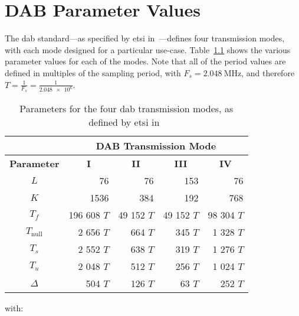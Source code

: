 \documentclass[class=report,11pt,crop=false]{standalone}
\begin{document}
\chapter{DAB Parameter Values \label{sect:dab-values_t-mode}}

The \gls{dab} standard---as specified by \gls{etsi} in~\cite{dabstandard}---defines four transmission modes, with each mode designed for a particular use-case. Table~\ref{tab:dab-parameters} shows the various parameter values for each of the modes. Note that all of the period values are defined in multiples of the sampling period, with \(F_s = \SI{2.048}{\mega\hertz}\), and therefore $T = \frac{1}{F_s} = \frac{1}{\num{2.048e6}}$.

{
\renewcommand{\arraystretch}{1.25}
\begin{table}[h]
    \centering
    \captionsetup{type=table}
    \begin{tabular}{c|r|r|r|r|}
    \cline{2-5}
     & \multicolumn{4}{c|}{\textbf{DAB Transmission Mode}} \\ \hline
    \multicolumn{1}{|c|}{\textbf{Parameter}} & \multicolumn{1}{c|}{\textbf{I}} & \multicolumn{1}{c|}{\textbf{II}} & \multicolumn{1}{c|}{\textbf{III}} & \multicolumn{1}{c|}{\textbf{IV}} \\ \hline
    \multicolumn{1}{|c|}{$L$} & 76 & 76 & 153 & 76 \\ \hline
    \multicolumn{1}{|c|}{$K$} & 1536 & 384 & 192 & 768 \\ \hline
    \multicolumn{1}{|c|}{$T_f$} & 196 608 $T$ & 49 152 $T$ & 49 152 $T$ & 98 304 $T$ \\ \hline
    \multicolumn{1}{|c|}{$T_\mathrm{null}$} & 2 656 $T$ & 664 $T$ & 345 $T$ & 1 328 $T$ \\ \hline
    \multicolumn{1}{|c|}{$T_s$} & 2 552 $T$ & 638 $T$ & 319 $T$ & 1 276 $T$ \\ \hline
    \multicolumn{1}{|c|}{$T_u$} & 2 048 $T$ & 512 $T$ & 256 $T$ & 1 024 $T$ \\ \hline
    \multicolumn{1}{|c|}{$\Delta$} & 504 $T$ & 126 $T$ & 63 $T$ & 252 $T$ \\ \hline
    \end{tabular}
    \caption{Parameters for the four \gls{dab} transmission modes, as defined by \gls{etsi} in~\cite{dabstandard}}
    \label{tab:dab-parameters}
    \end{table}
}
with:
\end{document}
